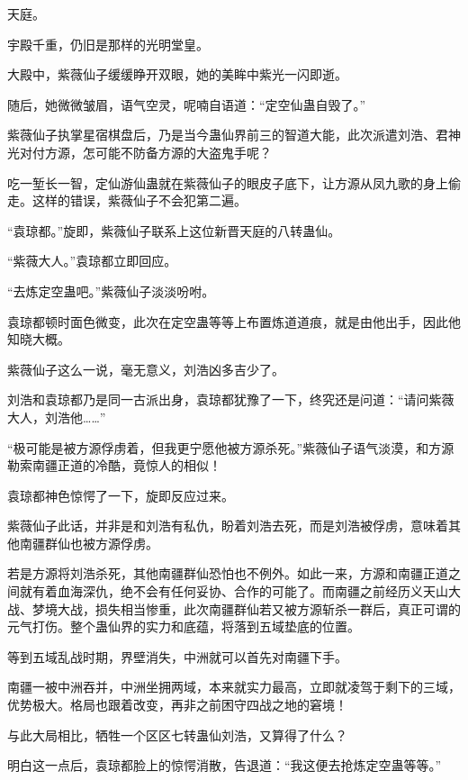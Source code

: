 
\begin{this_body}

天庭。

宇殿千重，仍旧是那样的光明堂皇。

大殿中，紫薇仙子缓缓睁开双眼，她的美眸中紫光一闪即逝。

随后，她微微皱眉，语气空灵，呢喃自语道：“定空仙蛊自毁了。”

紫薇仙子执掌星宿棋盘后，乃是当今蛊仙界前三的智道大能，此次派遣刘浩、君神光对付方源，怎可能不防备方源的大盗鬼手呢？

吃一堑长一智，定仙游仙蛊就在紫薇仙子的眼皮子底下，让方源从凤九歌的身上偷走。这样的错误，紫薇仙子不会犯第二遍。

“袁琼都。”旋即，紫薇仙子联系上这位新晋天庭的八转蛊仙。

“紫薇大人。”袁琼都立即回应。

“去炼定空蛊吧。”紫薇仙子淡淡吩咐。

袁琼都顿时面色微变，此次在定空蛊等等上布置炼道道痕，就是由他出手，因此他知晓大概。

紫薇仙子这么一说，毫无意义，刘浩凶多吉少了。

刘浩和袁琼都乃是同一古派出身，袁琼都犹豫了一下，终究还是问道：“请问紫薇大人，刘浩他……”

“极可能是被方源俘虏着，但我更宁愿他被方源杀死。”紫薇仙子语气淡漠，和方源勒索南疆正道的冷酷，竟惊人的相似！

袁琼都神色惊愕了一下，旋即反应过来。

紫薇仙子此话，并非是和刘浩有私仇，盼着刘浩去死，而是刘浩被俘虏，意味着其他南疆群仙也被方源俘虏。

若是方源将刘浩杀死，其他南疆群仙恐怕也不例外。如此一来，方源和南疆正道之间就有着血海深仇，绝不会有任何妥协、合作的可能了。而南疆之前经历义天山大战、梦境大战，损失相当惨重，此次南疆群仙若又被方源斩杀一群后，真正可谓的元气打伤。整个蛊仙界的实力和底蕴，将落到五域垫底的位置。

等到五域乱战时期，界壁消失，中洲就可以首先对南疆下手。

南疆一被中洲吞并，中洲坐拥两域，本来就实力最高，立即就凌驾于剩下的三域，优势极大。格局也跟着改变，再非之前困守四战之地的窘境！

与此大局相比，牺牲一个区区七转蛊仙刘浩，又算得了什么？

明白这一点后，袁琼都脸上的惊愕消散，告退道：“我这便去抢炼定空蛊等等。”


\end{this_body}
